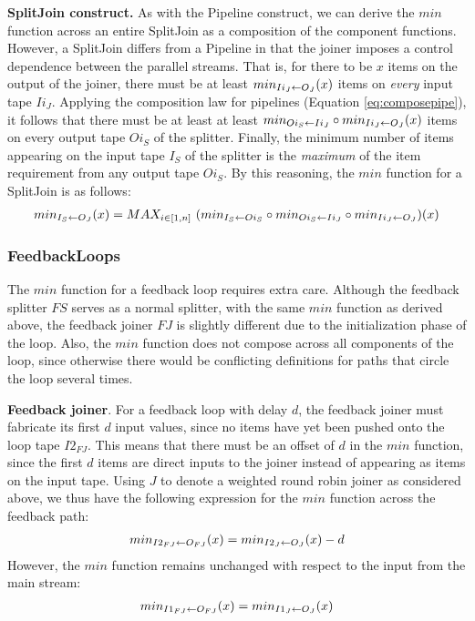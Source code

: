 {\bf SplitJoin construct.}  As with the Pipeline construct, we can
derive the $min$ function across an entire SplitJoin as a composition
of the component functions.  However, a SplitJoin differs from a
Pipeline in that the joiner imposes a control dependence between the
parallel streams.  That is, for there to be $x$ items on the output of
the joiner, there must be at least $min_{Ii_J \leftarrow O_J}(x)$ items on {\it
every} input tape $Ii_J$.  Applying the composition law for pipelines
(Equation \ref{eq:composepipe}), it follows that there must be at
least at least $min_{Oi_S \leftarrow Ii_J} \circ min_{Ii_J \leftarrow O_J}(x)$ items on
every output tape $Oi_S$ of the splitter.  Finally, the minimum number
of items appearing on the input tape $I_S$ of the splitter is the {\it
maximum} of the item requirement from any output tape $Oi_S$.  By this
reasoning, the $min$ function for a SplitJoin is as follows:
\begin{align*}
min_{I_S \leftarrow O_J}(x) = MAX_{i \in [1,n]}~(min_{I_S \leftarrow Oi_S} \circ
min_{Oi_S \leftarrow Ii_J} \circ min_{Ii_J \leftarrow O_J})(x)
\end{align*}

\subsubsection{FeedbackLoops}
\label{sec:timefl}

The $min$ function for a feedback loop requires extra care. Although
the feedback splitter $FS$ serves as a normal splitter, with the same
$min$ function as derived above, the feedback joiner $FJ$ is slightly
different due to the initialization phase of the loop.  Also, the
$min$ function does not compose across all components of the loop,
since otherwise there would be conflicting definitions for paths that
circle the loop several times.

{\bf Feedback joiner}.  For a feedback loop with delay $d$, the
feedback joiner must fabricate its first $d$ input values, since no
items have yet been pushed onto the loop tape $I2_{FJ}$.  This means
that there must be an offset of $d$ in the $min$ function, since the
first $d$ items are direct inputs to the joiner instead of appearing
as items on the input tape.  Using $J$ to denote a weighted round
robin joiner as considered above, we thus have the following
expression for the $min$ function across the feedback path:
\begin{align*}
min_{I2_{FJ} \leftarrow O_{FJ}}(x) = min_{I2_J \leftarrow O_J}(x) - d
\end{align*}
However, the $min$ function remains unchanged with respect to the
input from the main stream:
\begin{align*}
min_{I1_{FJ} \leftarrow O_{FJ}}(x) = min_{I1_J \leftarrow O_J}(x)
\end{align*}

